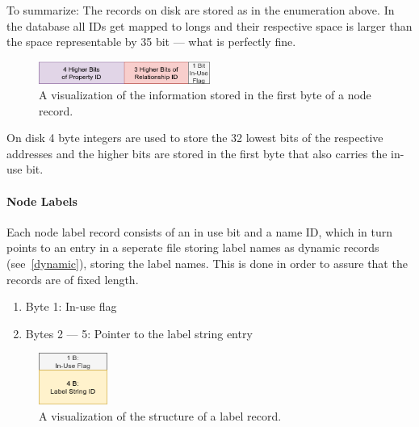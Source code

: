 \documentclass[a4paper,10pt]{article}
\begin{document}
            To summarize: The records on disk are stored as in the enumeration above. 
            In the database all IDs get mapped to longs and their respective space is larger than the space representable by 35 bit --- what is perfectly fine.
        
            \begin{figure}[htp]\label{node_first_byte}
                \begin{center}
                    \includegraphics[keepaspectratio,height=0.4\textheight,width=0.5\textwidth]{img/03_record/node/node_first_byte.png}
                \end{center}
                \caption{A visualization of the information stored in the first byte of a node record.} %
            \end{figure}
        
            On disk 4 byte integers are used to store the 32 lowest bits of the respective addresses and the higher bits are stored in the first byte that also carries the in-use bit.
        
          \paragraph{Node Labels}
            Each node label record consists of an in use bit and a name ID, which in turn points to an entry in a seperate file storing label names as dynamic records (see~\ref{dynamic}), storing the label names.
            This is done in order to assure that the records are of fixed length.
            \begin{enumerate}
                \item Byte 1: In-use flag
                \item Bytes 2 --- 5: Pointer to the label string entry
            \end{enumerate}
            
            \begin{figure}[htp]\label{label_record}
                \begin{center}
                    \includegraphics[keepaspectratio,height=0.2\textheight,width=0.2\textwidth]{img/03_record/node/label_record.png}
                \end{center}
                \caption{A visualization of the structure of a label record.} %
            \end{figure}
            
\end{document}
